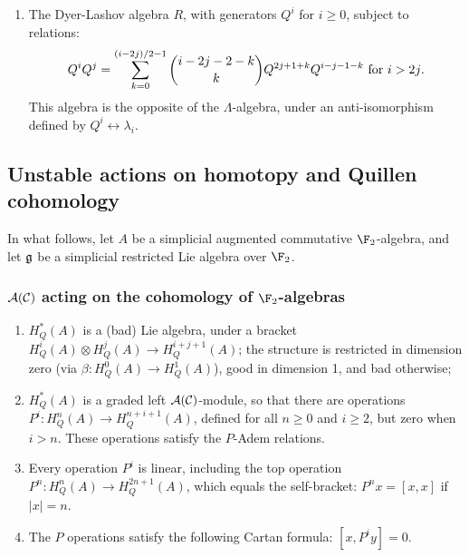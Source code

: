 \documentclass[10pt]{article}
\renewcommand{\Q}{Q}
\newcommand{\Comm}{\calC}
\newcommand{\CommSteen}{\calA(\Comm)}
\newcommand{\DyerLashov}{R}
\begin{document}
\begin{SteenrodAlgebrasAndTheirKoszulDuals}
\begin{enumerate}
\item The Dyer-Lashov algebra $\DyerLashov$, with generators $\Q^i$ for $i\geq0$, subject to relations:
\[\Q^i\Q^j=\sum_{k=0}^{(i-2j)/2-1}{i-2j-2-k\choose k}\Q^{2j+1+k}\Q^{i-j-1-k}\textup{\ for $i>2j$.}\]
This algebra is the opposite of the $\Lambda$-algebra, under an anti-isomorphism defined by $Q^i\longleftrightarrow \lambda_i$.
\end{enumerate}
\subsection{Unstable actions on homotopy and Quillen cohomology}
In what follows, let $A$ be a simplicial augmented commutative $\F_2$-algebra, and let $\mathfrak{g}$ be a simplicial restricted Lie algebra over $\F_2$.

\subsubsection{$\CommSteen$ acting on the cohomology of $\F_2$-algebras}
\begin{enumerate}\squishlist
\setlength{\parindent}{.25in}
\item $H^*_Q(A)$ is a (bad) Lie algebra, under a bracket $H^i_Q(A)\otimes H^j_Q(A)\to H^{i+j+1}_Q(A)$; the structure is restricted in dimension zero (via $\beta:H^0_Q(A)\to H^1_Q(A)$), good in dimension 1, and bad otherwise;
\item $H^*_Q(A)$ is a graded left $\CommSteen$-module, so that there are operations $P^i:H^n_Q(A)\to H^{n+i+1}_Q(A)$, defined for all $n\geq0$ and $i\geq2$, but zero when $i>n$. These operations satisfy the $P$-Adem relations.
\item Every operation $P^i$ is linear, including the top operation $P^n:H^n_Q(A)\to H^{2n+1}_Q(A)$, which equals the self-bracket:  $P^nx=[x,x]$ if $|x|=n$.
\item The $P$ operations satisfy the following Cartan formula:
$[x,P^iy]=0$.
\end{enumerate}


\end{SteenrodAlgebrasAndTheirKoszulDuals}
\end{document}
